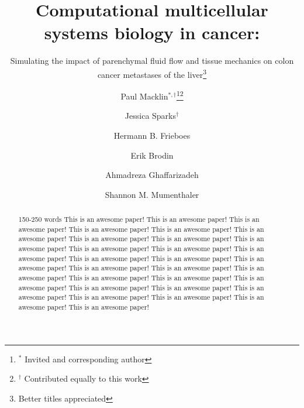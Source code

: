 \documentclass[smallextended,natbib]{svjour3}
\begin{document}
\title{Computational multicellular systems biology in cancer:}
\subtitle{Simulating the impact of parenchymal fluid flow and tissue mechanics on colon cancer metastases of 
the liver\footnote{Better titles appreciated}}
\dedication{Dedicated to all the papers we should have written.}

\author{Paul Macklin${}^{*,\dagger}$\thanks{${}^{*}$ Invited and corresponding author}\thanks{${}^{\dagger}$ Contributed equally to this work} \and Jessica Sparks${}^{\dagger}$ \and Hermann B. Frieboes  
\and Erik Brodin 
\and Ahmadreza Ghaffarizadeh  \and Shannon M. Mumenthaler}


\maketitle


\begin{abstract}150-250 words
This is an awesome paper! 
This is an awesome paper! 
This is an awesome paper! 
This is an awesome paper! 
This is an awesome paper! 
This is an awesome paper! 
This is an awesome paper! 
This is an awesome paper! 
This is an awesome paper! 
This is an awesome paper! 
This is an awesome paper! 
This is an awesome paper! 
This is an awesome paper! 
This is an awesome paper! 
This is an awesome paper! 
This is an awesome paper! 
This is an awesome paper! 
This is an awesome paper! 
This is an awesome paper! 
This is an awesome paper! 
This is an awesome paper! 
This is an awesome paper! 
This is an awesome paper! 
This is an awesome paper! 
This is an awesome paper! 
This is an awesome paper! 
This is an awesome paper! 
This is an awesome paper! 
\end{abstract}
\end{document}
